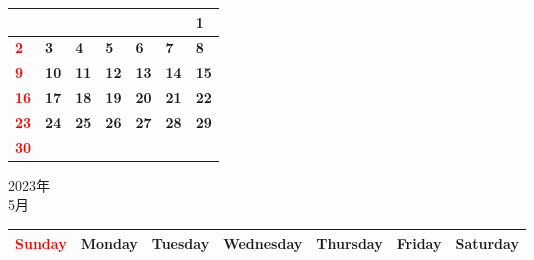 \documentclass[a4paper,landscape]{jsarticle}
\newcommand{\dig}{\hspace{29mm}}
\newcommand{\tdig}{\hspace{27mm}}
\newcommand{\LBF}{\LARGE\textbf}
\begin{document}
\begingroup
\renewcommand{\arraystretch}{4}
\begin{tabular}{|p{32mm}|p{32mm}|p{32mm}|p{32mm}|p{32mm}|p{32mm}|p{32mm}|}
\hline
&&&&&&\raisebox{30pt} {\dig\LBF{1}}\\
\hline
\raisebox{30pt} {\dig\textcolor{red}{\LBF{2}}}&\raisebox{30pt} {\dig\LBF{3}}&\raisebox{30pt} {\dig\LBF{4}}&\raisebox{30pt} {\dig\LBF{5}}&\raisebox{30pt} {\dig\LBF{6}}&\raisebox{30pt} {\dig\LBF{7}}&\raisebox{30pt} {\dig\LBF{8}}\\
\hline
\raisebox{30pt} {\dig\textcolor{red}{\LBF{9}}}&\raisebox{30pt} {\tdig\LBF{10}}&\raisebox{30pt} {\tdig\LBF{11}}&\raisebox{30pt} {\tdig\LBF{12}}&\raisebox{30pt} {\tdig\LBF{13}}&\raisebox{30pt} {\tdig\LBF{14}}&\raisebox{30pt} {\tdig\LBF{15}}\\
\hline
\raisebox{30pt} {\tdig\textcolor{red}{\LBF{16}}}&\raisebox{30pt} {\tdig\LBF{17}}&\raisebox{30pt} {\tdig\LBF{18}}&\raisebox{30pt} {\tdig\LBF{19}}&\raisebox{30pt} {\tdig\LBF{20}}&\raisebox{30pt} {\tdig\LBF{21}}&\raisebox{30pt} {\tdig\LBF{22}}\\
\hline
\raisebox{30pt} {\tdig\textcolor{red}{\LBF{23}}}&\raisebox{30pt} {\tdig\LBF{24}}&\raisebox{30pt} {\tdig\LBF{25}}&\raisebox{30pt} {\tdig\LBF{26}}&\raisebox{30pt} {\tdig\LBF{27}}&\raisebox{30pt} {\tdig\LBF{28}}&\raisebox{30pt} {\tdig\LBF{29}}\\
\hline
\raisebox{30pt} {\tdig\textcolor{red}{\LBF{30}}}&&&&&&\\
\hline
\end{tabular}
\endgroup

\newpage

\begin{center}
	\LARGE 2023年\\
	\LARGE 5月
\end{center}

\begingroup
\renewcommand{\arraystretch}{1.4}
\begin{tabular}{|>{\centering\arraybackslash}p{32mm}|>{\centering\arraybackslash}p{32mm}|>{\centering\arraybackslash}p{32mm}|>{\centering\arraybackslash}p{32mm}|>{\centering\arraybackslash}p{32mm}|>{\centering\arraybackslash}p{32mm}|>{\centering\arraybackslash}p{32mm}|}
\hline
\textcolor{red}{\large Sunday}&\large Monday&\large Tuesday&\large Wednesday&\large Thursday&\large Friday&\large Saturday\\
\hline
\end{tabular}
\endgroup
\end{document}
